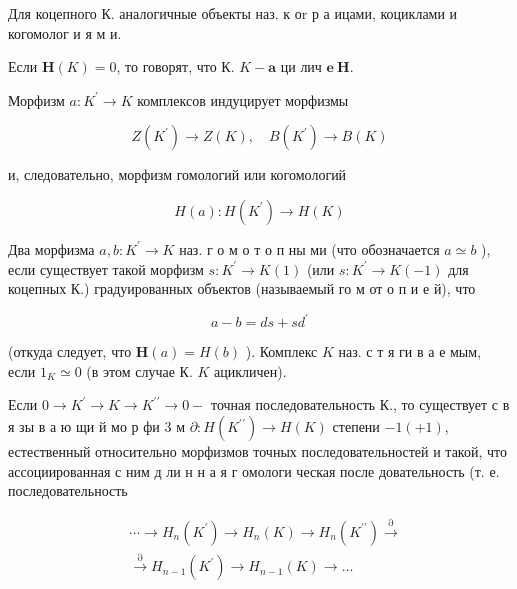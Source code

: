 \documentclass[10pt]{article}
\begin{document}
Для коцепного К. аналогичные объекты наз. к оr р а ицами, коциклами и когомолог и я м и.



Если $\boldsymbol{H}(K)=0$, то говорят, что К. $K-\mathbf{a}$ ци лич $\mathbf{e} \mathbf{~ H . ~}$



Морфизм $a: K^{\prime} \rightarrow K$ комплексов индуцирует морфизмы



\[

Z\left(K^{\prime}\right) \longrightarrow Z(K), \quad B\left(K^{\prime}\right) \longrightarrow B(K)

\]



и, следовательно, морфизм гомологий или когомологий



\[

H(a): H\left(K^{\prime}\right) \longrightarrow H(K)

\]



Два морфизма $a, b: K^{\prime} \rightarrow K$ наз. г о м о т о п ны ми (что обозначается $a \simeq b$ ), если существует такой морфизм $s: K^{\prime} \rightarrow K(1)$ (или $s: K^{\prime} \rightarrow K(-1)$ для коцепных К.) градуированных объектов (называемый го м от о п и е й), что



\[

a-b=d s+s d^{\prime}

\]



(откуда следует, что $\boldsymbol{H}(a)=H(b)$ ). Комплекс $K$ наз. с т я ги в а е мым, если $1_{K} \simeq 0$ (в этом случае К. $K$ ацикличен).



Если $0 \rightarrow K^{\prime} \rightarrow K \rightarrow K^{\prime \prime} \rightarrow 0-$ точная последовательность К., то существует с в я зы в а ю щи й мо р фи 3 м $\partial: H\left(K^{\prime \prime}\right) \rightarrow H(K)$ степени $-1(+1)$, естественный относительно морфизмов точных последовательностей и такой, что ассоциированная с ним д ли н н а я г омологи ческая после довательность (т. е. последовательность



\[

\begin{aligned}

& \cdots \longrightarrow H_{n}\left(K^{\prime}\right) \longrightarrow H_{n}(K) \longrightarrow H_{n}\left(K^{\prime \prime}\right) \stackrel{\partial}{\longrightarrow} \\

& \stackrel{\partial}{\longrightarrow} H_{n-1}\left(K^{\prime}\right) \longrightarrow H_{n-1}(K) \longrightarrow \ldots

\end{aligned}

\]
\end{document}
